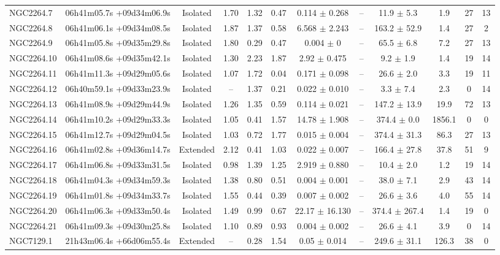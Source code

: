 \begin{landscape}
\begin{longtable}{lccccccccccc}
NGC2264.7	&	06h41m05.7s +09d34m06.9s	&	Isolated	&	1.70	&	1.32	&	0.47	&	0.114	$\pm$	0.268	&	--	&	11.9	$\pm$	5.3	&	1.9	&	27	&	13	\\
NGC2264.8	&	06h41m06.1s +09d34m08.5s	&	Isolated	&	1.87	&	1.37	&	0.58	&	6.568	$\pm$	2.243	&	--	&	163.2	$\pm$	52.9	&	1.4	&	27	&	2	\\
NGC2264.9	&	06h41m05.8s +09d35m29.8s	&	Isolated	&	1.80	&	0.29	&	0.47	&	0.004	$\pm$	0	&	--	&	65.5	$\pm$	6.8	&	7.2	&	27	&	13	\\
NGC2264.10	&	06h41m08.6s +09d35m42.1s	&	Isolated	&	1.30	&	2.23	&	1.87	&	2.92	$\pm$	0.475	&	--	&	9.2	$\pm$	1.9	&	1.4	&	19	&	14	\\
NGC2264.11	&	06h41m11.3s +09d29m05.6s	&	Isolated	&	1.07	&	1.72	&	0.04	&	0.171	$\pm$	0.098	&	--	&	26.6	$\pm$	2.0	&	3.3	&	19	&	11	\\
NGC2264.12	&	06h40m59.1s +09d33m23.9s	&	Isolated	&	--	&	1.37	&	0.21	&	0.022	$\pm$	0.010	&	--	&	3.3	$\pm$	7.4	&	2.3	&	0	&	14	\\
NGC2264.13	&	06h41m08.9s +09d29m44.9s	&	Isolated	&	1.26	&	1.35	&	0.59	&	0.114	$\pm$	0.021	&	--	&	147.2	$\pm$	13.9	&	19.9	&	72	&	13	\\
NGC2264.14	&	06h41m10.2s +09d29m33.3s	&	Isolated	&	1.05	&	0.41	&	1.57	&	14.78	$\pm$	1.908	&	--	&	374.4	$\pm$	0.0	&	1856.1	&	0	&	0	\\
NGC2264.15	&	06h41m12.7s +09d29m04.5s	&	Isolated	&	1.03	&	0.72	&	1.77	&	0.015	$\pm$	0.004	&	--	&	374.4	$\pm$	31.3	&	86.3	&	27	&	13	\\
NGC2264.16	&	06h41m02.8s +09d36m14.7s	&	Extended	&	2.12	&	0.41	&	1.03	&	0.022	$\pm$	0.007	&	--	&	166.4	$\pm$	27.8	&	37.8	&	51	&	9	\\
NGC2264.17	&	06h41m06.8s +09d33m31.5s	&	Isolated	&	0.98	&	1.39	&	1.25	&	2.919	$\pm$	0.880	&	--	&	10.4	$\pm$	2.0	&	1.2	&	19	&	14	\\
NGC2264.18	&	06h41m04.3s +09d34m59.3s	&	Isolated	&	1.38	&	0.80	&	0.51	&	0.004	$\pm$	0.001	&	--	&	38.0	$\pm$	7.1	&	2.9	&	43	&	14	\\
NGC2264.19	&	06h41m01.8s +09d34m33.7s	&	Isolated	&	1.55	&	0.44	&	0.39	&	0.007	$\pm$	0.002	&	--	&	26.6	$\pm$	3.6	&	4.0	&	55	&	14	\\
NGC2264.20	&	06h41m06.3s +09d33m50.4s	&	Isolated	&	1.49	&	0.99	&	0.67	&	22.17	$\pm$	16.130	&	--	&	374.4	$\pm$	267.4	&	1.4	&	19	&	0	\\
NGC2264.21	&	06h41m09.3s +09d30m25.8s	&	Isolated	&	1.10	&	0.89	&	0.93	&	0.004	$\pm$	0.002	&	--	&	26.6	$\pm$	4.1	&	3.9	&	0	&	14	\\
NGC7129.1	&	21h43m06.4s +66d06m55.4s	&	Extended	&	--	&	0.28	&	1.54	&	0.05	$\pm$	0.014	&	--	&	249.6	$\pm$	31.1	&	126.3	&	38	&	0	\\

\end{longtable}
\end{landscape}
